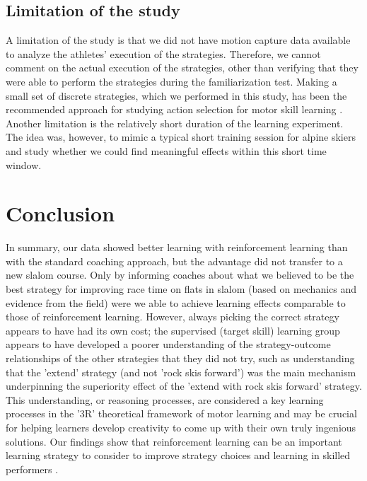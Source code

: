 \documentclass[pdflatex,sn-mathphys-num]{sn-jnl}%
\theoremstyle{thmstyleone}%
\theoremstyle{thmstyletwo}%
\theoremstyle{thmstylethree}%
\begin{document}
\subsection{Limitation of the study}
A limitation of the study is that we did not have motion capture data available to analyze the athletes' execution of the strategies. Therefore, we cannot comment on the actual execution of the strategies, other than verifying that they were able to perform the strategies during the familiarization test. Making a small set of discrete strategies, which we performed in this study, has been the recommended approach for studying action selection for motor skill learning \cite{taylor_role_2012, taylor_flexible_2011}. Another limitation is the relatively short duration of the learning experiment. The idea was, however, to mimic a typical short training session for alpine skiers and study whether we could find meaningful effects within this short time window.

\section{Conclusion}
In summary, our data showed better learning with reinforcement learning than with the standard coaching approach, but the advantage did not transfer to a new slalom course. Only by informing coaches about what we believed to be the best strategy for improving race time on flats in slalom (based on mechanics and evidence from the field) were we able to achieve learning effects comparable to those of reinforcement learning. However, always picking the correct strategy appears to have had its own cost; the supervised (target skill) learning group appears to have developed a poorer understanding of the strategy-outcome relationships of the other strategies that they did not try, such as understanding that the 'extend' strategy (and not 'rock skis forward') was the main mechanism underpinning the superiority effect of the 'extend with rock skis forward' strategy. This understanding, or reasoning processes, are considered a key learning processes in the '3R' theoretical framework \cite{tsay_strategic_2023} of motor learning and may be crucial for helping learners develop creativity to come up with their own truly ingenious solutions\cite{ericsson_scientific_1998}. Our findings show that reinforcement learning can be an important learning strategy \cite{hasson_reinforcement_2015} to consider to improve strategy choices and learning in skilled performers \cite{lohse_errors_2019, yarrow_inside_2009}.
\end{document}
